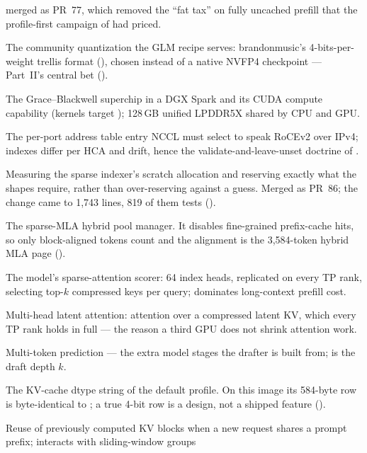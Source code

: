 \begin{description}
    merged as PR~77, which removed the ``fat tax'' on fully uncached prefill
    that the profile-first campaign of  had priced.
  \item[EXL3 / TR3 (II)] The community quantization the GLM recipe
    serves: brandonmusic's 4-bits-per-weight trellis format
    (), chosen instead of a native NVFP4
    checkpoint --- Part~II's central bet ().
  \item[GB10 / SM121] The Grace--Blackwell superchip in a DGX Spark and its
    CUDA compute capability (kernels target ); 128\,GB unified
    LPDDR5X shared by CPU and GPU.
  \item[GID (RoCE)] The per-port address table entry NCCL must select to
    speak RoCEv2 over IPv4; indexes differ per HCA and drift, hence the
    validate-and-leave-unset doctrine of .
  \item[Indexer workspace right-sizing (II)] Measuring the sparse
    indexer's scratch allocation and reserving exactly what the shapes
    require, rather than over-reserving against a guess. Merged as PR~86;
    the change came to 1{,}743 lines, 819 of them tests
    ().
  \item[KpoolTailManager (II)] The sparse-MLA hybrid pool manager.
    It disables fine-grained prefix-cache hits, so only block-aligned tokens
    count and the alignment is the 3{,}584-token hybrid MLA page
    ().
  \item[Lightning indexer] The model's sparse-attention scorer: 64 index
    heads, replicated on every TP rank, selecting top-$k$ compressed keys
    per query; dominates long-context prefill cost.
  \item[MLA] Multi-head latent attention: attention over a compressed latent
    KV, which every TP rank holds in full --- the reason a third GPU does not
    shrink attention work.
  \item[MTP] Multi-token prediction --- the extra model stages the drafter
    is built from;  is the draft depth $k$.
  \item[NVFP4 / \code{nvfp4_ds_mla}] The KV-cache dtype string of the
    default profile. On this image its 584-byte row is byte-identical to
    ; a true 4-bit row is a design, not a shipped feature
    ().
  \item[Prefix caching] Reuse of previously computed KV blocks when a new
    request shares a prompt prefix; interacts with sliding-window groups

\end{description}
